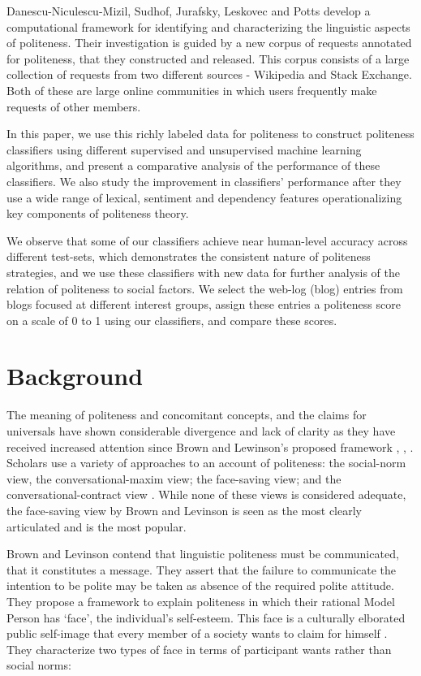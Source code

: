 \documentclass[conference]{IEEEtran}
\begin{document}
Danescu-Niculescu-Mizil, Sudhof, Jurafsky, Leskovec and Potts \cite{Jurafsky} develop a computational framework for identifying and characterizing the linguistic aspects of politeness. Their investigation is guided by a new corpus of requests annotated for politeness, that they constructed and released. This corpus consists of a large collection of requests from two different sources - Wikipedia and Stack Exchange. Both of these are large online communities in which users frequently make requests of other members. 

In this paper, we use this richly labeled data for politeness to construct politeness classifiers using different supervised and unsupervised machine learning algorithms, and present a comparative analysis of the performance of these classifiers. We also study the improvement in classifiers' performance after they use a wide range of lexical, sentiment and dependency features operationalizing key components of politeness theory. 

We observe that some of our classifiers achieve near human-level accuracy across different test-sets, which demonstrates the consistent nature of politeness strategies, and we use these classifiers with new data for further analysis of the relation of politeness to social factors. We select the web-log (blog) entries from blogs focused at different interest groups, assign these entries a politeness score on a scale of 0 to 1 using our classifiers, and compare these scores. 


\section{Background}
The meaning of politeness and concomitant concepts, and the claims for universals have shown considerable divergence and lack of clarity as they have received increased attention since Brown and Lewinson's proposed framework \cite{Meier}, \cite{Brown1}, \cite{Brown2}. Scholars use a variety of approaches to an account of politeness: the social-norm view, the conversational-maxim view; the face-saving view; and the conversational-contract view \cite{Fraser}. While none of these views is considered adequate, the face-saving view by Brown and Levinson is seen as the most clearly articulated and is the most popular.

Brown and Levinson contend that linguistic politeness must be communicated, that it constitutes a message. They assert that the failure to communicate the intention to be polite may be taken as absence of the required polite attitude. They propose a framework to explain politeness in which their rational Model Person has `face', the individual's self-esteem. This face is a culturally elborated public self-image that every member of a society wants to claim for himself \cite{Fraser}. They characterize two types of face in terms of participant wants rather than social norms:
\end{document}
